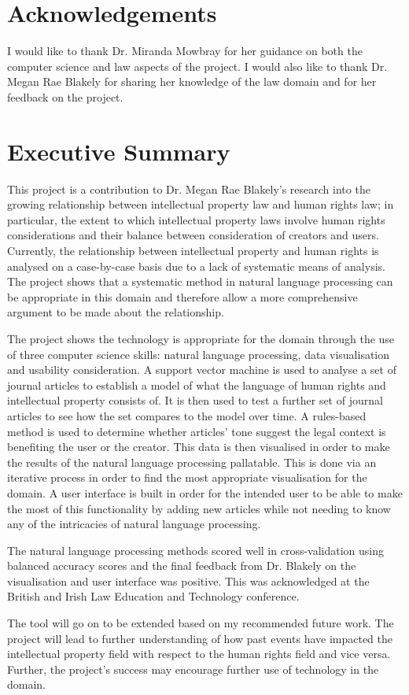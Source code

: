\section*{Acknowledgements}
	I would like to thank Dr. Miranda Mowbray for her guidance on both the computer science and law aspects of the project. I would also like to thank Dr. Megan Rae Blakely for sharing her knowledge of the law domain and for her feedback on the project.
	
	\newpage
\section*{Executive Summary}	
	This project is a contribution to Dr. Megan Rae Blakely's research into the growing relationship between intellectual property law and human rights law; in particular, the extent to which intellectual property laws involve human rights considerations and their balance between consideration of creators and users. Currently, the relationship between intellectual property and human rights is analysed on a case-by-case basis due to a lack of systematic means of analysis. The project shows that a systematic method in natural language processing can be appropriate in this domain and therefore allow a more comprehensive argument to be made about the relationship.
	
	The project shows the technology is appropriate for the domain through the use of three computer science skills: natural language processing, data visualisation and usability consideration. A support vector machine is used to analyse a set of journal articles to establish a model of what the language of human rights and intellectual property consists of. It is then used to test a further set of journal articles to see how the set compares to the model over time. A rules-based method is used to determine whether articles' tone suggest the legal context is benefiting the user or the creator. This data is then visualised in order to make the results of the natural language processing pallatable. This is done via an iterative process in order to find the most appropriate visualisation for the domain. A user interface is built in order for the intended user to be able to make the most of this functionality by adding new articles while not needing to know any of the intricacies of natural language processing.
	
	The natural language processing methods scored well in cross-validation using balanced accuracy scores and the final feedback from Dr. Blakely on the visualisation and user interface was positive. This was acknowledged at the British and Irish Law Education and Technology conference. 
	
	The tool will go on to be extended based on my recommended future work. The project will lead to further understanding of how past events have impacted the intellectual property field with respect to the human rights field and vice versa. Further, the project's success may encourage further use of technology in the domain.

\tableofcontents